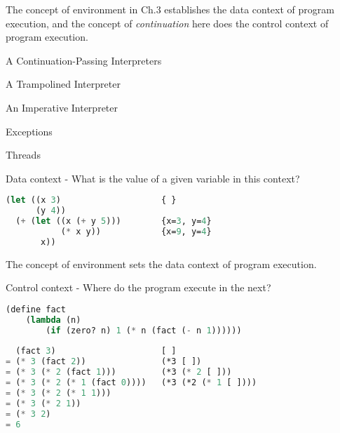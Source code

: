 \documentclass{article}
\begin{document}
\begin{huge}

\sf


The concept of environment in Ch.3 establishes the data context of program execution, 
and the concept of {\it continuation} here does the control context of program execution.

\blob A Continuation-Passing Interpreters

\blob A Trampolined Interpreter

\blob An Imperative Interpreter

\blob Exceptions

\blob Threads


Data context \al
- What is the value of a given variable in this context? \al

\begin{lstlisting}[language=Lisp]
(let ((x 3)                    { }
      (y 4)) 
  (+ (let ((x (+ y 5)))        {x=3, y=4}
           (* x y))            {x=9, y=4}
       x))
\end{lstlisting}

The concept of environment sets the data context of program execution.


Control context \al
- Where do the program execute in the next? \al

\begin{lstlisting}[language=Lisp]
(define fact 
    (lambda (n) 
        (if (zero? n) 1 (* n (fact (- n 1))))))
        
  (fact 3)                     [ ]
= (* 3 (fact 2))               (*3 [ ])
= (* 3 (* 2 (fact 1)))         (*3 (* 2 [ ]))
= (* 3 (* 2 (* 1 (fact 0))))   (*3 (*2 (* 1 [ ])))
= (* 3 (* 2 (* 1 1)))
= (* 3 (* 2 1))
= (* 3 2)
= 6
\end{lstlisting}


\end{huge}
\end{document}
